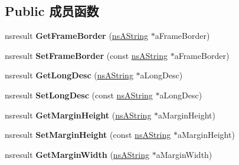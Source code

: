 \subsection*{Public 成员函数}
\begin{DoxyCompactItemize}
\item 
\mbox{\label{interfacens_i_d_o_m_h_t_m_l_frame_element_a4588a2c283ec4adb5a77614b3610d361}} 
nsresult {\bfseries Get\+Frame\+Border} (\hyperlink{structns_string_container}{ns\+A\+String} $\ast$a\+Frame\+Border)
\item 
\mbox{\label{interfacens_i_d_o_m_h_t_m_l_frame_element_aebdc773b143b1a235520794cc7ab9604}} 
nsresult {\bfseries Set\+Frame\+Border} (const \hyperlink{structns_string_container}{ns\+A\+String} $\ast$a\+Frame\+Border)
\item 
\mbox{\label{interfacens_i_d_o_m_h_t_m_l_frame_element_a08f1b7f87d415199ee4a93ad80bb3150}} 
nsresult {\bfseries Get\+Long\+Desc} (\hyperlink{structns_string_container}{ns\+A\+String} $\ast$a\+Long\+Desc)
\item 
\mbox{\label{interfacens_i_d_o_m_h_t_m_l_frame_element_ab08a1432d736e2c3a492ffc42c3856ef}} 
nsresult {\bfseries Set\+Long\+Desc} (const \hyperlink{structns_string_container}{ns\+A\+String} $\ast$a\+Long\+Desc)
\item 
\mbox{\label{interfacens_i_d_o_m_h_t_m_l_frame_element_acae697bb36ea8b5e083b974363d27b27}} 
nsresult {\bfseries Get\+Margin\+Height} (\hyperlink{structns_string_container}{ns\+A\+String} $\ast$a\+Margin\+Height)
\item 
\mbox{\label{interfacens_i_d_o_m_h_t_m_l_frame_element_a80baff1394751d572e18952dfb8ecbab}} 
nsresult {\bfseries Set\+Margin\+Height} (const \hyperlink{structns_string_container}{ns\+A\+String} $\ast$a\+Margin\+Height)
\item 
\mbox{\label{interfacens_i_d_o_m_h_t_m_l_frame_element_a72838f0ceacaf057caf1395be2d0493e}} 
nsresult {\bfseries Get\+Margin\+Width} (\hyperlink{structns_string_container}{ns\+A\+String} $\ast$a\+Margin\+Width)

\end{DoxyCompactItemize}
